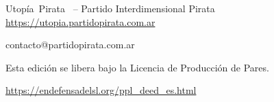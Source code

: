 \newpage
\thispagestyle{empty}

\begin{flushleft}\hbox{\Large{Utopía Pirata}}
\copyleft \, \the\year\space -- Partido Interdimensional Pirata
\url{https://utopia.partidopirata.com.ar}

contacto@partidopirata.com.ar

\vfill

\centering
{}

Esta edición se libera bajo la Licencia de Producción de Pares.

\footnotesize{\url{https://endefensadelsl.org/ppl_deed_es.html}}

\end{flushleft}
\newpage
